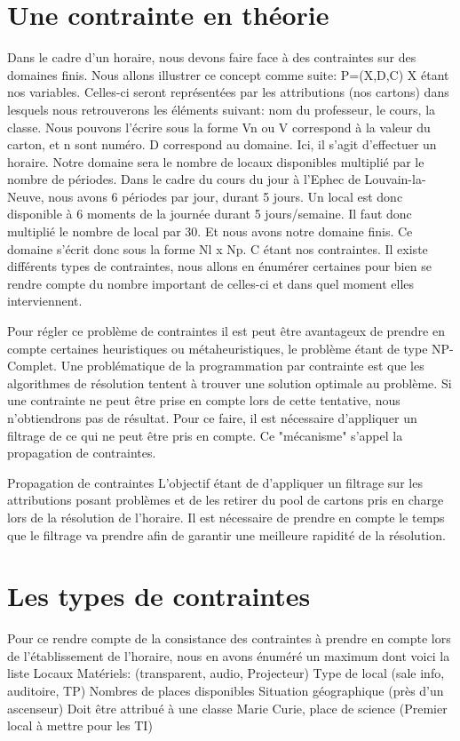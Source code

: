 \section{Une contrainte en théorie}
Dans le cadre d'un horaire, nous devons faire face à des contraintes sur des domaines finis. Nous allons illustrer ce concept comme suite:
P=(X,D,C)
	X étant nos variables. Celles-ci seront représentées par les attributions (nos cartons) dans lesquels nous retrouverons les éléments suivant: nom du professeur, le cours, la classe. Nous pouvons l'écrire sous la forme Vn ou V correspond à la valeur du carton, et n sont numéro.
	D correspond au domaine. Ici, il s'agit d'effectuer un horaire. Notre domaine sera le nombre de locaux disponibles multiplié par le nombre de périodes. Dans le cadre du cours du jour à l'Ephec de Louvain-la-Neuve, nous avons 6 périodes par jour, durant 5 jours. Un local est donc disponible à 6 moments de la journée durant 5 jours/semaine. Il faut donc multiplié le nombre de local par 30. Et nous avons notre domaine finis. Ce domaine s'écrit donc sous la forme Nl x Np.
	C étant nos contraintes. Il existe différents types de contraintes, nous allons en énumérer certaines pour bien se rendre compte du nombre important de celles-ci et dans quel moment elles interviennent.

Pour régler ce problème de contraintes il est peut être avantageux de prendre en compte certaines heuristiques ou métaheuristiques, le problème étant de type NP-Complet.
Une problématique de la programmation par contrainte est que les algorithmes de résolution tentent à trouver une solution optimale au problème. Si une contrainte ne peut être prise en compte lors de cette tentative, nous n'obtiendrons pas de résultat. Pour ce faire, il est nécessaire d'appliquer un filtrage de ce qui ne peut être pris en compte. Ce "mécanisme" s'appel la propagation de contraintes.

Propagation de contraintes
L'objectif étant de d'appliquer un filtrage sur les attributions posant problèmes et de les retirer du pool de cartons pris en charge lors de la résolution de l'horaire. Il est nécessaire de prendre en compte le temps que le filtrage va prendre afin de garantir une meilleure rapidité de la résolution.

\section{Les types de contraintes}
Pour ce rendre compte de la consistance des contraintes à prendre en compte lors de l'établissement de l'horaire, nous en avons énuméré un maximum dont voici la liste
Locaux
Matériels: (transparent, audio, Projecteur)
Type de local (sale info, auditoire, TP)
Nombres de places disponibles
Situation géographique (près d'un ascenseur)
Doit être attribué à une classe
Marie Curie, place de science (Premier local à mettre pour les TI)

